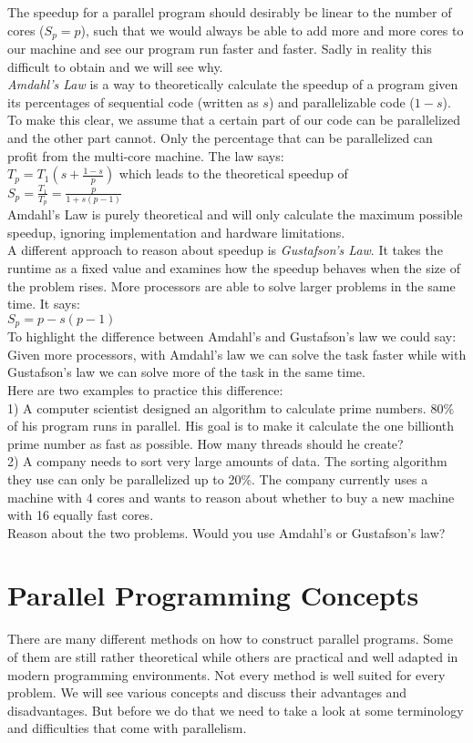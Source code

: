 \documentclass{scrreprt}
\begin{document}
The speedup for a parallel program should desirably be linear to the number of cores ($S_p = p$), such that we would always be able to add more and more cores to our machine and see our program run faster and faster. Sadly in reality this difficult to obtain and we will see why. \\
\textit{Amdahl's Law} is a way to theoretically calculate the speedup of a program given its percentages of sequential code (written as $s$) and parallelizable code ($1-s$). To make this clear, we assume that a certain part of our code can be parallelized and the other part cannot. Only the percentage that can be parallelized can profit from the multi-core machine. The law says: \\
$T_p = T_1(s+\frac{1-s}{p})$ which leads to the theoretical speedup of $S_p = \frac{T_1}{T_p} = \frac{p}{1+s(p-1)}$\\
Amdahl's Law is purely theoretical and will only calculate the maximum possible speedup, ignoring implementation and hardware limitations.\\
A different approach to reason about speedup is \textit{Gustafson's Law}. It takes the runtime as a fixed value and examines how the speedup behaves when the size of the problem rises. More processors are able to solve larger problems in the same time. It says:\\
$S_p = p-s(p-1) $ \\
To highlight the difference between Amdahl's and Gustafson's law we could say: Given more processors, with Amdahl's law we can solve the task faster while with Gustafson's law we can solve more of the task in the same time. \\
Here are two examples to practice this difference: \\
1) A computer scientist designed an algorithm to calculate prime numbers. $80\%$ of his program runs in parallel. His goal is to make it calculate the one billionth prime number as fast as possible. How many threads should he create? \\
2) A company needs to sort very large amounts of data. The sorting algorithm they use can only be parallelized up to 20\%. The company currently uses a machine with 4 cores and wants to reason about whether to buy a new machine with 16 equally fast cores. \\
Reason about the two problems. Would you use Amdahl's or Gustafson's law?

\section{Parallel Programming Concepts}
There are many different methods on how to construct parallel programs. Some of them are still rather theoretical while others are practical and well adapted in modern programming environments. Not every method is well suited for every problem. We will see various concepts and discuss their advantages and disadvantages. But before we do that we need to take a look at some terminology and difficulties that come with parallelism. \\
\end{document}
